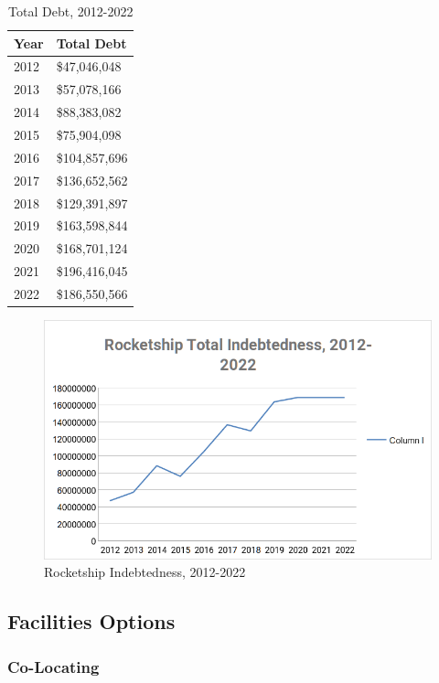 \begin{table}[hbt]\caption{Total Debt, 2012-2022}\label{tab:total_debt}
  \begin{tabular}{ll}
    \toprule
    \textbf{Year} & \textbf{Total Debt}\\
    \midrule
    2012 & \$47,046,048\\
    2013 & \$57,078,166\\
    2014 & \$88,383,082\\
    2015 & \$75,904,098\\
    2016 & \$104,857,696\\
    2017 & \$136,652,562\\
    2018 & \$129,391,897\\
    2019 & \$163,598,844\\        
    2020 & \$168,701,124\\
    2021 & \$196,416,045\\
    2022 & \$186,550,566\\
    \bottomrule
  \end{tabular}
\end{table}

\begin{figure}[hbt]
  \centering
  \includegraphics{Debt}
  \caption{Rocketship Indebtedness, 2012-2022}
  \label{fig:total_debt}
\end{figure}

\subsection{Facilities Options}\label{sec:findings-facilities-options}\indent

\subsubsection{Co-Locating}\label{sec:findings-co-locating}\indent

